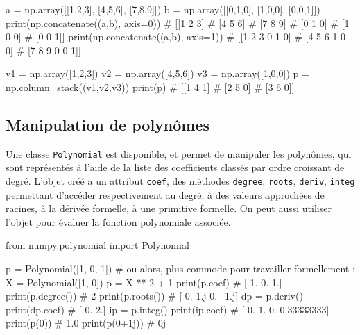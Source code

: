 \documentclass[10pt,fleqn]{article} %
\begin{document}
\begin{multicols}{3}
\begin{python}
a = np.array([[1,2,3],
              [4,5,6],
              [7,8,9]])
b = np.array([[0,1,0],
              [1,0,0],
              [0,0,1]])
print(np.concatenate((a,b), axis=0))
# [[1 2 3]
#  [4 5 6]
#  [7 8 9]
#  [0 1 0]
#  [1 0 0]
#  [0 0 1]]
print(np.concatenate((a,b), axis=1))
# [[1 2 3 0 1 0]
#  [4 5 6 1 0 0]
#  [7 8 9 0 0 1]]

v1 = np.array([1,2,3])
v2 = np.array([4,5,6])
v3 = np.array([1,0,0])
p = np.column_stack((v1,v2,v3))
print(p)
# [[1 4 1]
#  [2 5 0]
#  [3 6 0]]  
\end{python}
\end{multicols}

\subsection{Manipulation de polynômes}

Une classe \texttt{Polynomial} est disponible, et permet de manipuler
les polynômes, qui sont représentés à l'aide de la liste des
coefficients classés par ordre croissant de degré. L'objet créé a un
attribut \texttt{coef}, des méthodes \texttt{degree}, \texttt{roots},
\texttt{deriv}, \texttt{integ} permettant d'accéder respectivement au degré, à des
valeurs approchées de racines, à la dérivée formelle, à une primitive
formelle. On peut aussi utiliser l'objet pour évaluer la fonction
polynomiale associée.

\begin{multicols}{2}
\begin{python}
from numpy.polynomial import Polynomial

p = Polynomial([1, 0, 1])
# ou alors, plus commode pour travailler formellement : 
X = Polynomial([1, 0])
p = X ** 2 + 1 
print(p.coef)
# [ 1.  0.  1.]
print(p.degree())
# 2
print(p.roots())
# [ 0.-1.j  0.+1.j]
dp = p.deriv()
print(dp.coef)
# [ 0.  2.]
ip = p.integ()
print(ip.coef)
# [ 0.          1.          0.          0.33333333]  
print(p(0))
# 1.0
print(p(0+1j))
# 0j
\end{python}
\end{multicols}
\begin{thebibliography}{2}

\end{thebibliography}
\end{document}
